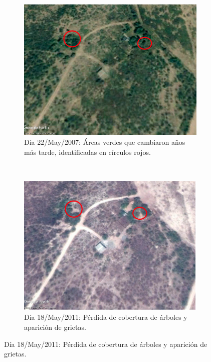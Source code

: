 \documentclass[12pt,letterpaper]{article}
\begin{document}
\begin{enumerate}
    \begin{figure}[H]
        \centering
        \begin{subfigure}{5\textwidth}
            \centering
            \includegraphics[scale=0.6]{figure3.png}
            \caption{Día 22/May/2007: Áreas verdes que cambiaron años más tarde, identificadas en círculos rojos.}
            \label{fig:caminos1}
        \end{subfigure}\\
        \begin{subfigure}{5\textwidth}
            \centering
            \includegraphics[scale=0.6]{figure4.png}
            \caption{Día 18/May/2011: Pérdida de cobertura de árboles y aparición de grietas.}

\end{subfigure}
\end{figure}
\end{enumerate}
\end{document}
